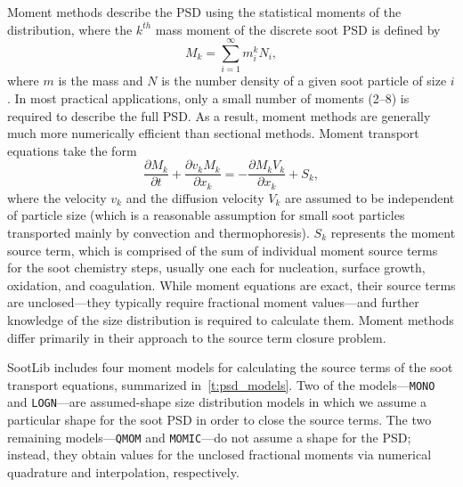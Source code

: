 \documentclass[preprint,letterpaper]{elsarticle}
\begin{document}
Moment methods describe the PSD using the statistical moments of the distribution, where the $k^{th}$ mass moment of the discrete soot PSD is defined by
\begin{equation}
    M_k = \sum_{i=1}^{\infty} m_i^k N_i,
\end{equation}
where $m$ is the mass and $N$ is the number density of a given soot particle of size $i$. In most practical applications, only a small number of moments (2--8) is required to describe the full PSD. As a result, moment methods are generally much more numerically efficient than sectional methods. Moment transport equations take the form
\begin{equation}
    \label{e:momTransEq}
    \frac{\partial M_k}{\partial t} + \frac{\partial v_k M_k}{\partial x_k} = -\frac{\partial M_k V_k}{\partial x_k} + S_k,
\end{equation}
where the velocity $v_k$ and the diffusion velocity $V_k$ are assumed to be independent of particle size (which is a reasonable assumption for small soot particles transported mainly by convection and thermophoresis). $S_k$ represents the moment source term, which is comprised of the sum of individual moment source terms for the soot chemistry steps, usually one each for nucleation, surface growth, oxidation, and coagulation. While moment equations are exact, their source terms are unclosed---they typically require fractional moment values---and further knowledge of the size distribution is required to calculate them. Moment methods differ primarily in their approach to the source term closure problem.

SootLib includes four moment models for calculating the source terms of the soot transport equations, summarized in~\ref{t:psd_models}. Two of the models---\texttt{MONO} and \texttt{LOGN}---are assumed-shape size distribution models in which we assume a particular shape for the soot PSD in order to close the source terms. The two remaining models---\texttt{QMOM} and \texttt{MOMIC}---do not assume a shape for the PSD; instead, they obtain values for the unclosed fractional moments via numerical quadrature and interpolation, respectively.
\end{document}
